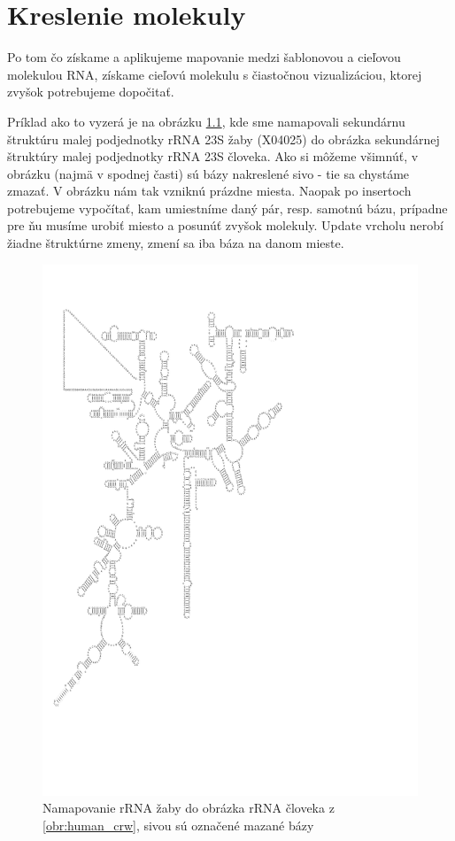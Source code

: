 \newcommand{\degree}{\ensuremath{^{\circ}}}

\chapter{Kreslenie molekuly}

Po tom čo získame a aplikujeme mapovanie medzi šablonovou a cieľovou molekulou RNA,
získame cieľovú molekulu s čiastočnou vizualizáciou, ktorej zvyšok potrebujeme dopočitať.

Príklad ako to vyzerá je na obrázku \ref{obr:frog_to_human}, kde sme
namapovali sekundárnu štruktúru malej podjednotky rRNA 23S žaby (X04025) do
obrázka sekundárnej štruktúry malej podjednotky rRNA 23S človeka.
Ako si môžeme všimnúť, v obrázku (najmä v spodnej časti) sú bázy nakreslené
sivo - tie sa chystáme zmazať. V obrázku nám tak vzniknú prázdne miesta.
Naopak po insertoch potrebujeme vypočítať, kam umiestníme daný pár,
resp. samotnú bázu, prípadne pre ňu musíme urobiť miesto a posunúť zvyšok
molekuly. Update vrcholu nerobí žiadne štruktúrne zmeny, zmení sa iba
báza na danom mieste.

\begin{figure}
  \centering
  \includegraphics[clip, trim=0 5cm 6cm 2cm, width=1\textwidth]{../img/african_frog-to-human-mapped}
  \caption{Namapovanie rRNA žaby do obrázka rRNA človeka z \ref{obr:human_crw}, sivou sú označené mazané bázy}
  \label{obr:frog_to_human}
\end{figure}

